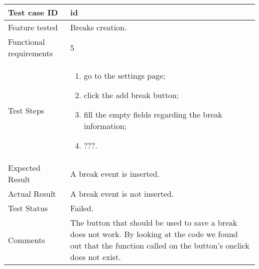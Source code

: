 \begin{table}[H]
	\begin{center}
		\begin{tabular}{ | p{} | p{} | }
		\hline
		Test case ID & id\\
		\hline
		Feature tested & Breaks creation.\\
    	\hline
		Functional requirements & 5  \\
		\hline
		Test Steps & 
			\begin{enumerate}
				\item go to the settings page;
				\item click the add break button;
				\item fill the empty fields regarding the break information;
				\item ???.
			\end{enumerate} \\
		\hline
		Expected Result & A break event is inserted.\\
		\hline
		Actual Result & A break event is not inserted.\\ 
		\hline
		Test Status & \color{Red}Failed.\\ 
		\hline
		Comments & The button that should be used to save a break does not work. By looking at the code we found out that the function called on the button's onclick does not exist.\\
		\hline
		
		\end{tabular}
	\end{center}
\end{table}

